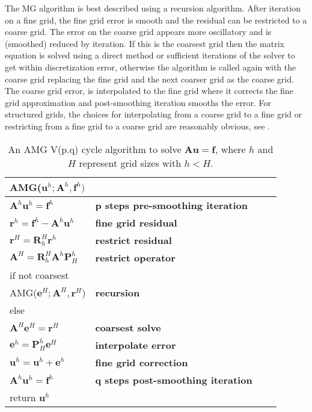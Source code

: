 The MG algorithm is best described using a recursion algorithm.  After iteration on a fine grid, the fine grid error is smooth and the residual can be restricted to a coarse grid. The error on the coarse grid appears more oscillatory and is (smoothed) reduced by iteration.  If this is the coarsest grid then the matrix equation is solved using a direct method or sufficient iterations of the solver to get within discretization error, otherwise the algorithm is called again with the coarse grid replacing the fine grid and the next coarser grid as the coarse grid.  The coarse grid error, is interpolated to the fine grid where it corrects the fine grid approximation and post-smoothing iteration smooths the error.  For structured grids, the choices for interpolating from a coarse grid to a fine grid or restricting from a fine grid to a coarse grid are reasonably obvious, see \cite{Briggs2000}. 


\begin{table}\center
\begin{tabular}{|l|l|ll}
\hline
AMG($\mathbf{u}^h;\mathbf{A}^h,\mathbf{f}^h)$ &\\ \hline
    \quad $\mathbf{A}^h\mathbf{u}^h=\mathbf{f}^h$ & \textbf{p steps pre-smoothing iteration}\\
	\quad $\mathbf{r}^h=\mathbf{f}^h-\mathbf{A}^h \mathbf{u}^h$ & \textbf{fine grid residual}\\
	\quad $\mathbf{r}^H=\mathbf{R}_h^H \mathbf{r}^h$ & \textbf{restrict residual} \\
	\quad $\mathbf{A}^H=\mathbf{R}_h^{H} \mathbf{A}^h \mathbf{P}_H^h$& \textbf{restrict operator}\\
	\quad if not coarsest  &\\
	  \quad\quad AMG($\mathbf{e}^H;\mathbf{A}^H,\mathbf{r}^H$) &\textbf{recursion}\\
	  \quad else &\\
	  \quad\quad $\mathbf{A}^H\mathbf{e}^H=\mathbf{r}^H$ & \textbf{coarsest solve}\\
	\quad$\mathbf{e}^h=\mathbf{P}_H^h \mathbf{e}^H$ & \textbf{interpolate error} \\
	\quad$\mathbf{u}^h=\mathbf{u}^h+\mathbf{e}^h$ & \textbf{fine grid correction}\\
	\quad$\mathbf{A}^h\mathbf{u}^h=\mathbf{f}^h$ & \textbf{q steps post-smoothing iteration}\\
	\quad return $\mathbf{u}^h$ &\\
\hline
\end{tabular}\caption{An AMG V(p.q) cycle algorithm to solve $\mathbf{A}\mathbf{u}=\mathbf{f}$, where $h$ and $H$ represent grid sizes with $h<H$.}
\end{table}


